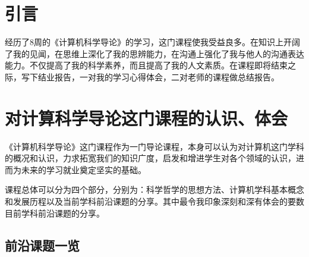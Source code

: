 \documentclass{article}
\begin{document}
\thispagestyle{empty}
\newpage
\setcounter{page}{1}
\section{引言}
经历了8周的《计算机科学导论》的学习，这门课程使我受益良多。在知识上开阔了我的见闻，在思维上深化了我的思辨能力，在沟通上强化了我与他人的沟通表达能力。不仅提高了我的科学素养，而且提高了我的人文素质。在课程即将结束之际，写下结业报告，一对我的学习心得体会，二对老师的课程做总结报告。

\section{对计算科学导论这门课程的认识、体会}
《计算机科学导论》这门课程作为一门导论课程，本身可以认为对计算机这门学科的概况和认识，力求拓宽我们的知识广度，启发和增进学生对各个领域的认识，进而为未来的学习就业奠定坚实的基础。\par
课程总体可以分为四个部分，分别为：科学哲学的思想方法、计算机学科基本概念和发展历程以及当前学科前沿课题的分享。其中最令我印象深刻和深有体会的要数目前学科前沿课题的分享。\par


\subsection{前沿课题一览}
\end{document}
